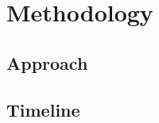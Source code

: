 \documentclass{article}
\begin{document}
\section{Methodology}
\label{sec:methodology}

\subsection{Approach}
\label{subsec:approach}

\subsection{Timeline}
\label{subsec:timeline}



\end{document}
